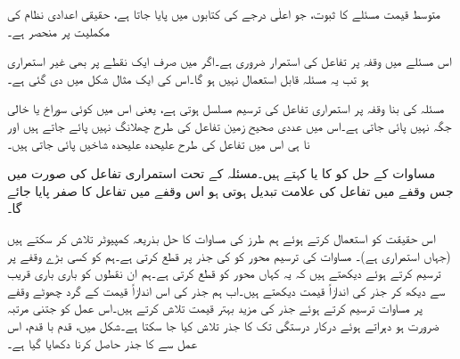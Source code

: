متوسط قیمت مسئلے کا ثبوت، جو اعلٰی درجے کی کتابوں میں پایا جاتا ہے، حقیقی اعدادی نظام کی مکملیت پر منحصر ہے۔

اس مسئلے میں وقفہ  پر تفاعل  کی استمرار ضروری ہے۔اگر  میں صرف ایک نقطے پر بھی  غیر استمراری ہو تب یہ مسئلہ قابل استعمال نہیں ہو گا۔اس کی ایک مثال شکل  میں دی گئی ہے۔


مسئلہ  کی بنا وقفہ  پر استمراری تفاعل کی ترسیم مسلسل ہوتی ہے، یعنی اس میں کوئی سوراخ یا خالی جگہ نہیں پائی جاتی ہے۔اس میں عددی صحیح زمین تفاعل  کی طرح چھلانگ  نہیں پائے جاتے ہیں اور نا ہی اس میں تفاعل  کی طرح علیحدہ علیحدہ شاخیں پائی جاتی ہیں۔

مساوات  کے حل کو  کا  یا  کہتے ہیں۔مسئلہ  کے تحت استمراری تفاعل کی صورت میں جس وقفے میں تفاعل کی علامت  تبدیل ہوتی ہو اس وقفے میں تفاعل کا صفر پایا جائے گا۔

اس حقیقت کو استعمال کرتے ہوئے ہم   طرز کی مساوات کا حل بذریعہ کمپیوٹر تلاش کر سکتے ہیں  (جہاں  استمراری ہے)۔ مساوات کی ترسیم  محور کو  کی جذر پر قطع کرتی ہے۔ہم  کو کسی بڑے وقفے پر ترسیم کرتے ہوئے دیکھتے ہیں کہ یہ کہاں  محور کو قطع کرتی ہے۔ہم ان نقطوں  کو باری باری قریب سے دیکھ کر جذر کی اندازاً قیمت دیکھتے ہیں۔اب ہم جذر کی اس اندازاً  قیمت کے گرد چھوٹے وقفے پر مساوات ترسیم کرتے ہوئے جذر کی مزید بہتر قیمت تلاش کرتے ہیں۔اس عمل کو جتنی مرتبہ ضرورت ہو دہراتے ہوئے درکار درستگی تک کا جذر تلاش کیا جا سکتا ہے۔شکل  میں، قدم با قدم، اس عمل سے   کا  جذر حاصل کرنا دکھایا گیا ہے۔

